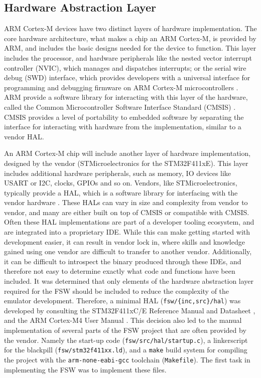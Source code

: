\documentclass[../report.tex]{subfiles}
\begin{document}
\subsection{Hardware Abstraction Layer} \label{sec:fsw-hal}

ARM Cortex-M devices have two distinct layers of hardware implementation. The
core hardware architecture, what makes a chip an ARM Cortex-M, is provided by
ARM, and includes the basic designs needed for the device to function. This
layer includes the processor, and hardware peripherals like the nested vector
interrupt controller (NVIC), which manages and dispatches interrupts; or the
serial wire debug (SWD) interface, which provides developers with a universal
interface for programming and debugging firmware on ARM Cortex-M
microcontrollers \citep{armcm4_manual}. ARM provide a software library for
interacting with this layer of the hardware, called the Common Microcontroller
Software Interface Standard (CMSIS) \citep{CMSIS}. CMSIS provides a level of portability to
embedded software by separating the interface for interacting with hardware
from the implementation, similar to a vendor HAL.

An ARM Cortex-M chip will include another layer of hardware implementation,
designed by the vendor (STMicroelectronics for the STM32F411xE). This
layer includes additional hardware peripherals, such as memory, IO devices like
USART or I2C, clocks, GPIOs and so on. Vendors, like STMicroelectronics,
typically provide a HAL, which is a software library for interfacing with the
vendor hardware \citep{stm32hal}. These HALs can vary in size and complexity
from vendor to vendor, and many are either built on top of CMSIS or compatible
with CMSIS.
Often these HAL implementations are part of a developer tooling
ecosystem, and are integrated into a proprietary IDE. While this can make
getting started with development easier, it can result in vendor lock in, where
skills and knowledge gained using one vendor are difficult to transfer to
another vendor. Additionally, it can be difficult to introspect the binary
produced through these IDEs, and therefore not easy to determine exactly what
code and functions have been included.
It was determined that only elements of the hardware abstraction layer required
for the FSW should be included to reduce the complexity of the emulator
development. Therefore, a minimal HAL (\lstinline|fsw/{inc,src}/hal|) was
developed by consulting the STM32F411xC/E Reference Manual and Datasheet
\citep{stm32f4_manual, stm32f4_datasheet}, and the ARM Cortex-M4 User Manual
\citep{armcm4_manual}. This decision also led to the manual implementation of
several parts of the FSW project that are often provided by the vendor. Namely
the start-up code (\lstinline|fsw/src/hal/startup.c|), a linkerscript for the
blackpill (\lstinline|fsw/stm32f411xx.ld|), and a \lstinline|make| build system
for compiling the project with the \lstinline|arm-none-eabi-gcc| toolchain
(\lstinline|Makefile|). The first task in implementing the FSW was to implement
these files.
\end{document}
